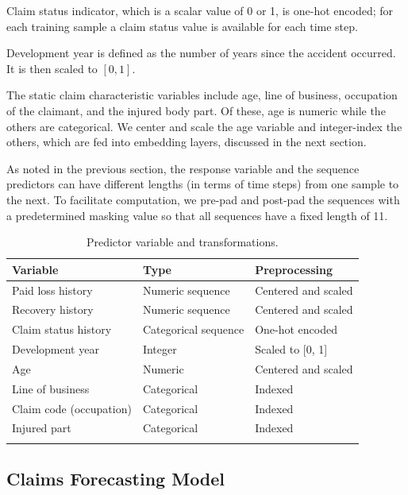 \documentclass{article}
\begin{document}
Claim status indicator, which is a scalar value of 0 or 1, is one-hot encoded; for each training sample a claim status value is available for each time step.

Development year is defined as the number of years since the accident occurred. It is then scaled to $[0, 1]$.

The static claim characteristic variables include age, line of business, occupation of the claimant, and the injured body part. Of these, age is numeric while the others are categorical. We center and scale the age variable and integer-index the others, which are fed into embedding layers, discussed in the next section.

As noted in the previous section, the response variable and the sequence predictors can have different lengths (in terms of time steps) from one sample to the next. To facilitate computation, we pre-pad and post-pad the sequences with a predetermined masking value so that all sequences have a fixed length of 11.

\begin{table}[ht]
\centering
\begin{tabular}[t]{lll}
\toprule
Variable & Type & Preprocessing\\
\midrule
Paid loss history      & Numeric sequence         & Centered and scaled\\
Recovery history       & Numeric sequence         & Centered and scaled\\
Claim status history   & Categorical sequence     & One-hot encoded\\
Development year       & Integer                  & Scaled to [0, 1]\\
Age                    & Numeric                  & Centered and scaled\\
Line of business       & Categorical              & Indexed\\
Claim code (occupation)& Categorical              & Indexed\\
Injured part           & Categorical              & Indexed\\
\bottomrule\\[1ex]
\end{tabular}
\caption{Predictor variable and transformations.}
\label{table:vars}
\end{table}%

\subsection{Claims Forecasting Model}\label{sec:claims-forecasting-model}
\end{document}
